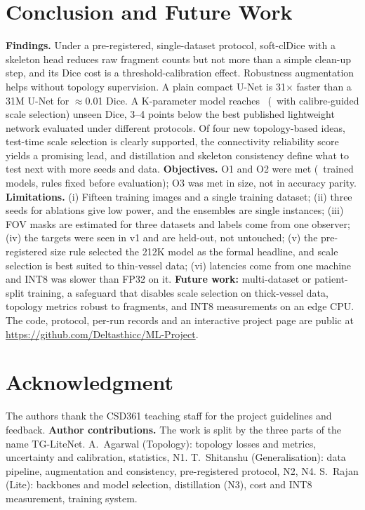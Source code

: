 \documentclass[conference]{IEEEtran}
\begin{document}
\section{Conclusion and Future Work}
\textbf{Findings.} Under a pre-registered, single-dataset protocol, soft-clDice with a skeleton head reduces raw fragment counts but not more than a simple clean-up step, and its Dice cost is a threshold-calibration effect. Robustness augmentation helps without topology supervision. A plain compact U-Net is 31$\times$ faster than a 31M U-Net for $\approx$0.01 Dice. A \hParamsK K-parameter model reaches \HTuned\ (\HSel\ with calibre-guided scale selection) unseen Dice, 3--4 points below the best published lightweight network evaluated under different protocols. Of four new topology-based ideas, test-time scale selection is clearly supported, the connectivity reliability score yields a promising lead, and distillation and skeleton consistency define what to test next with more seeds and data. \textbf{Objectives.} O1 and O2 were met (\nTrainAll\ trained models, rules fixed before evaluation); O3 was met in size, not in accuracy parity.
\textbf{Limitations.} (i) Fifteen training images and a single training dataset; (ii) three seeds for ablations give low power, and the ensembles are single instances; (iii) FOV masks are estimated for three datasets and labels come from one observer; (iv) the targets were seen in v1 and are held-out, not untouched; (v) the pre-registered size rule selected the 212K model as the formal headline, and scale selection is best suited to thin-vessel data; (vi) latencies come from one machine and INT8 was slower than FP32 on it. \textbf{Future work:} multi-dataset or patient-split training, a safeguard that disables scale selection on thick-vessel data, topology metrics robust to fragments, and INT8 measurements on an edge CPU. The code, protocol, per-run records and an interactive project page are public at \url{https://github.com/Deltasthicc/ML-Project}.

\section*{Acknowledgment}
The authors thank the CSD361 teaching staff for the project guidelines and feedback. \textbf{Author contributions.} The work is split by the three parts of the name TG-LiteNet. A.~Agarwal (Topology): topology losses and metrics, uncertainty and calibration, statistics, N1. T.~Shitanshu (Generalisation): data pipeline, augmentation and consistency, pre-registered protocol, N2, N4. S.~Rajan (Lite): backbones and model selection, distillation (N3), cost and INT8 measurement, training system.
\end{document}
